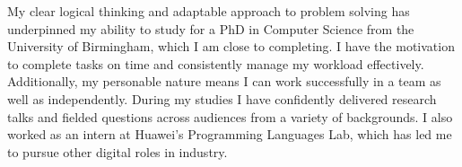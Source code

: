 
\vspace*{\fill}
\hspace{-2.5em}
\begin{minipage}{\sidewidth+0.5\margin}
\begin{center}

\vspace{2em}


\vspace{1em}

My clear logical thinking and adaptable approach to problem solving has
underpinned my ability to study for a PhD in Computer Science from the
University of Birmingham, which I am close to completing.
I have the motivation to complete tasks on time and consistently manage my
workload effectively.
Additionally, my personable nature means I can work
successfully in a team as well as independently.
During my studies I have confidently delivered research talks and fielded
questions across audiences from a variety of backgrounds.
I also worked as an intern at Huawei's Programming Languages Lab, which has led
me to pursue other digital roles in industry.

\vspace{2em}


\vspace{1em}



\end{center}
\end{minipage}
